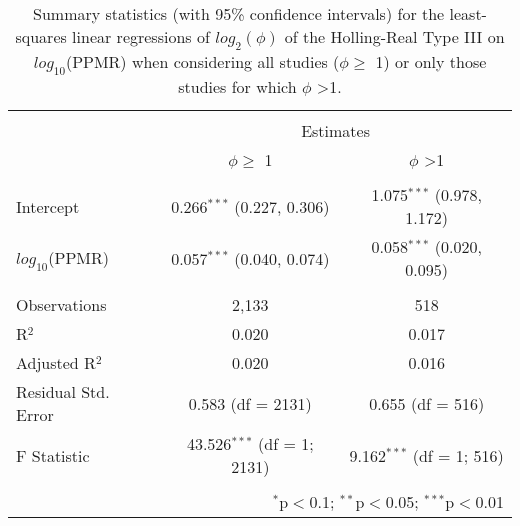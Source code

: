 
\begin{table}[!htbp] \centering 
  \caption{Summary statistics (with 95\% confidence intervals) for the least-squares linear regressions of $log_2(\phi)$ of the Holling-Real Type III on $log_{10}$(PPMR) when considering all studies ($\phi \geq$ 1) or only those studies for which $\phi$ \textgreater 1.} 
  \label{tab:m-ppmr} 
\begin{tabular}{@{\extracolsep{5pt}}lcc} 
\\[-1.8ex]\hline 
\hline \\[-1.8ex] 
 & \multicolumn{2}{c}{Estimates} \\ 
\cline{2-3} 
 & $\phi \geq$ 1 & $\phi$ \textgreater 1 \\ 
\hline \\[-1.8ex] 
 Intercept & 0.266$^{***}$ (0.227, 0.306) & 1.075$^{***}$ (0.978, 1.172) \\ 
  $log_{10}$(PPMR) & 0.057$^{***}$ (0.040, 0.074) & 0.058$^{***}$ (0.020, 0.095) \\ 
 \hline \\[-1.8ex] 
Observations & 2,133 & 518 \\ 
R$^{2}$ & 0.020 & 0.017 \\ 
Adjusted R$^{2}$ & 0.020 & 0.016 \\ 
Residual Std. Error & 0.583 (df = 2131) & 0.655 (df = 516) \\ 
F Statistic & 43.526$^{***}$ (df = 1; 2131) & 9.162$^{***}$ (df = 1; 516) \\ 
\hline 
\hline \\[-1.8ex] 
\multicolumn{3}{r}{$^{*}$p$<$0.1; $^{**}$p$<$0.05; $^{***}$p$<$0.01} \\ 
\end{tabular} 
\end{table} 
